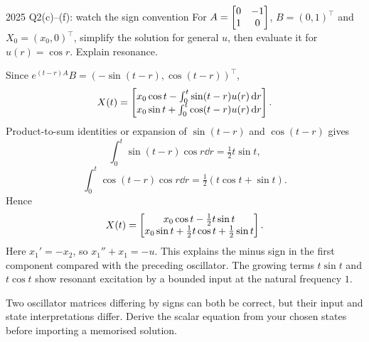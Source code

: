 \begin{question}{2025 Q2(c)--(f): watch the sign convention}
For $A=\begin{bmatrix}0&-1\\1&0\end{bmatrix}$, $B=(0,1)^{\top}$ and $X_0=(x_0,0)^{\top}$, simplify the solution for general $u$, then evaluate it for $u(r)=\cos r$. Explain resonance.
\end{question}
\begin{answer}
Since $e^{(t-r)A}B=(-\sin(t-r),\cos(t-r))^{\top}$,
\[X(t)=\begin{bmatrix}x_0\cos t-\int_0^t\sin(t-r)u(r)\,\mathrm d r\\x_0\sin t+\int_0^t\cos(t-r)u(r)\,\mathrm d r\end{bmatrix}.\]
Product-to-sum identities or expansion of $\sin(t-r)$ and $\cos(t-r)$ gives
\[\int_0^t\sin(t-r)\cos r\dd r=\tfrac12t\sin t,\]
\[\int_0^t\cos(t-r)\cos r\dd r=\tfrac12(t\cos t+\sin t).\]
Hence
\[X(t)=\begin{bmatrix}x_0\cos t-\frac12t\sin t\\x_0\sin t+\frac12t\cos t+\frac12\sin t\end{bmatrix}.\]
Here $x_1'=-x_2$, so $x_1''+x_1=-u$. This explains the minus sign in the first component compared with the preceding oscillator. The growing terms $t\sin t$ and $t\cos t$ show resonant excitation by a bounded input at the natural frequency $1$.
\end{answer}
\begin{tip}
Two oscillator matrices differing by signs can both be correct, but their input and state interpretations differ. Derive the scalar equation from your chosen states before importing a memorised solution.
\end{tip}

